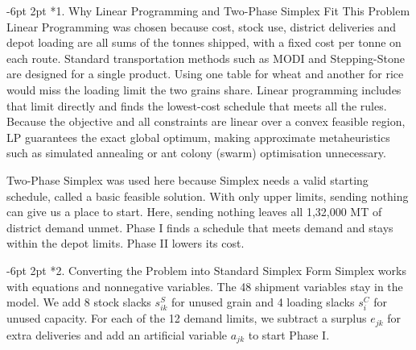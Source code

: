 \documentclass[10pt,a4paper]{article}
\makeatletter
\renewcommand\subsection{\@startsection{subsection}{2}{\z@}%
                                     {-6pt \@plus -2pt \@minus -1pt}%
                                     {2pt \@plus 1pt}%
                                     {\normalfont\large\bfseries}}
\makeatother
\begin{document}
\subsection*{1. Why Linear Programming and Two-Phase Simplex Fit This Problem}
Linear Programming was chosen because cost, stock use, district deliveries and depot loading are all sums of the tonnes shipped, with a fixed cost per tonne on each route. Standard transportation methods such as MODI and Stepping-Stone are designed for a single product. Using one table for wheat and another for rice would miss the loading limit the two grains share. Linear programming includes that limit directly and finds the lowest-cost schedule that meets all the rules. Because the objective and all constraints are linear over a convex feasible region, LP guarantees the exact global optimum, making approximate metaheuristics such as simulated annealing or ant colony (swarm) optimisation unnecessary.

Two-Phase Simplex was used here because Simplex needs a valid starting schedule, called a basic feasible solution. With only upper limits, sending nothing can give us a place to start. Here, sending nothing leaves all 1,32,000 MT of district demand unmet. Phase I finds a schedule that meets demand and stays within the depot limits. Phase II lowers its cost.

\subsection*{2. Converting the Problem into Standard Simplex Form}
Simplex works with equations and nonnegative variables. The 48 shipment variables stay in the model. We add 8 stock slacks $s^S_{ik}$ for unused grain and 4 loading slacks $s^C_i$ for unused capacity. For each of the 12 demand limits, we subtract a surplus $e_{jk}$ for extra deliveries and add an artificial variable $a_{jk}$ to start Phase I.
\end{document}
